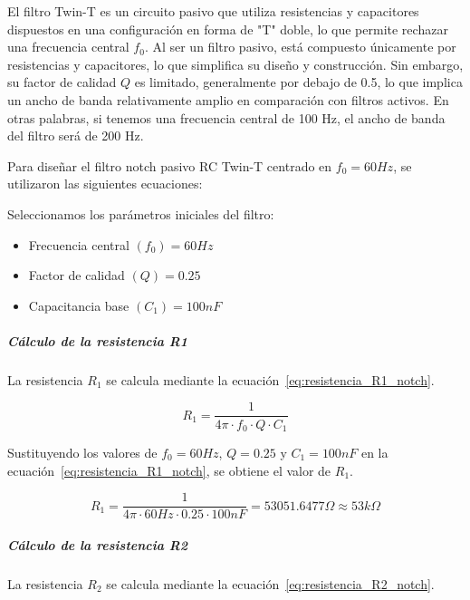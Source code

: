                 El filtro Twin-T es un circuito pasivo que utiliza resistencias y capacitores dispuestos en una configuración en forma de "T" doble, lo que permite rechazar una frecuencia central $f_0$. Al ser un filtro pasivo, está compuesto únicamente por resistencias y capacitores, lo que simplifica su diseño y construcción. Sin embargo, su factor de calidad $Q$ es limitado, generalmente por debajo de 0.5, lo que implica un ancho de banda relativamente amplio en comparación con filtros activos. En otras palabras, si tenemos una frecuencia central de 100 Hz, el ancho de banda del filtro será de 200 Hz.

                Para diseñar el filtro notch pasivo RC Twin-T centrado en $f_0 = 60 Hz$, se utilizaron las siguientes ecuaciones:

                Seleccionamos los parámetros iniciales del filtro:
                \begin{itemize}
                    \item Frecuencia central $(f_0) = 60 Hz$
                    \item Factor de calidad $(Q) = 0.25$
                    \item Capacitancia base $(C_1) = 100 nF$
                \end{itemize}

                \subparagraph{Cálculo de la resistencia R1}
                    La resistencia $R_1$ se calcula mediante la ecuación~\ref{eq:resistencia_R1_notch}.

                    \begin{equation}
                        \label{eq:resistencia_R1_notch}
                        R_1 = \frac{1}{4\pi \cdot f_0 \cdot Q \cdot C_1}
                    \end{equation}

                    Sustituyendo los valores de $f_0 = 60 Hz$, $Q = 0.25$ y $C_1 = 100 nF$ en la ecuación~\ref{eq:resistencia_R1_notch}, se obtiene el valor de $R_1$.

                    \begin{equation}
                        R_1 = \frac{1}{4\pi \cdot 60 Hz \cdot 0.25 \cdot 100 nF} = 53051.6477 \Omega \approx 53 k\Omega
                    \end{equation}

                \subparagraph{Cálculo de la resistencia R2}
                    La resistencia $R_2$ se calcula mediante la ecuación~\ref{eq:resistencia_R2_notch}.

